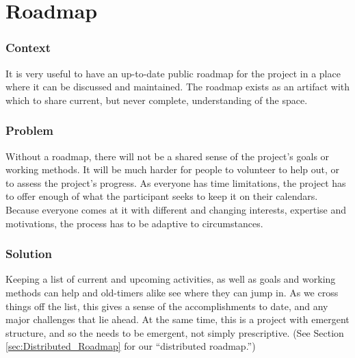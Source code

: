 \section{Roadmap} \label{sec:Roadmap}

\subsubsection*{Context} It is very useful to have an up-to-date public roadmap for the project in a place where it can be discussed and maintained. The roadmap exists as an artifact with which to share current, but never complete, understanding of the space.

\subsubsection*{Problem} Without a roadmap, there will not be a shared sense of the project's goals or working methods. It will be much harder for people to volunteer to help out, or to assess the project's progress.  As everyone has time limitations, the project has to offer enough of what the participant seeks to keep it on their calendars.  Because everyone comes at it with different and changing interests, expertise  and motivations, the process has to be adaptive to circumstances.

\subsubsection*{Solution} Keeping a list of current and upcoming activities, as well as goals and working methods can help  and old-timers alike see where they can jump in. As we cross things off the list, this gives a sense of the accomplishments to date, and any major challenges that lie ahead.  At the same time, this is a project with emergent structure, and so the  needs to be emergent, not simply prescriptive.  (See Section \ref{sec:Distributed_Roadmap} for our ``distributed roadmap.'')

